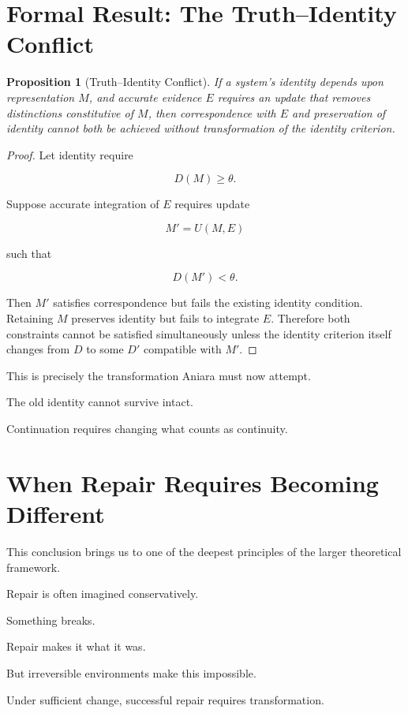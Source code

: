 \documentclass[11pt,oneside]{book}
\newtheorem{proposition}[theorem]{Proposition}
\theoremstyle{definition}
\theoremstyle{remark}
\begin{document}
\section{Formal Result: The Truth--Identity Conflict}

\begin{proposition}[Truth--Identity Conflict]
If a system's identity depends upon representation \(M\), and accurate evidence \(E\) requires an update that removes distinctions constitutive of \(M\), then correspondence with \(E\) and preservation of identity cannot both be achieved without transformation of the identity criterion.
\end{proposition}

\begin{proof}
Let identity require

\[
D(M)\geq\theta.
\]

Suppose accurate integration of \(E\) requires update

\[
M'=U(M,E)
\]

such that

\[
D(M')<\theta.
\]

Then \(M'\) satisfies correspondence but fails the existing identity condition. Retaining \(M\) preserves identity but fails to integrate \(E\). Therefore both constraints cannot be satisfied simultaneously unless the identity criterion itself changes from \(D\) to some \(D'\) compatible with \(M'\).
\end{proof}

This is precisely the transformation Aniara must now attempt.

The old identity cannot survive intact.

Continuation requires changing what counts as continuity.

\section{When Repair Requires Becoming Different}

This conclusion brings us to one of the deepest principles of the larger theoretical framework.

Repair is often imagined conservatively.

Something breaks.

Repair makes it what it was.

But irreversible environments make this impossible.

Under sufficient change, successful repair requires transformation.
\end{document}
